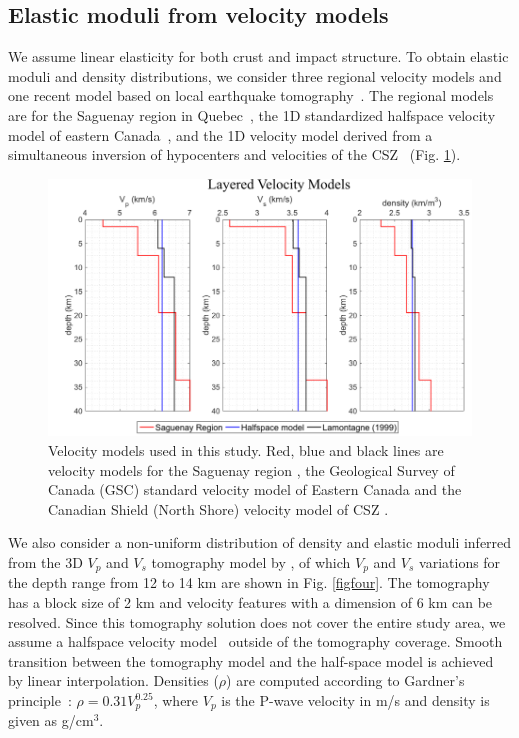 \documentclass[draft]{agujournal2018}
\begin{document}
\subsection{Elastic moduli from velocity models}
We assume linear elasticity for both crust and impact structure. To obtain elastic moduli and density distributions, we consider three regional velocity models and one recent model based on local earthquake tomography~\citep{Powell_2017}. The regional models are for the Saguenay region in Quebec~\citep{Somerville1990}, the 1D standardized halfspace velocity model of eastern Canada~\citep{lamontagne1999}, and the 1D velocity model derived from a simultaneous inversion of hypocenters and velocities of the CSZ~\citep{lamontagne1999} (Fig. \ref{figthree}).

\begin{figure}[ht]
\centering
\includegraphics[width=30pc]{Figures/layered_vel_models.png}
\caption{Velocity models used in this study. Red, blue and black lines are velocity models for the Saguenay region \citep{Somerville1990}, the Geological Survey of Canada (GSC) standard velocity model of Eastern Canada \citep{lamontagne1999} and the Canadian Shield (North Shore) velocity model of CSZ \citep{lamontagne1999}.}
\label{figthree}
\end{figure}

We also consider a non-uniform distribution of density and elastic moduli inferred from the 3D $V_p$ and $V_s$ tomography model by \citet{Powell_2017}, of which $V_p$ and $V_s$ variations for the depth range from 12 to 14 km are shown in Fig. \ref{figfour}. The tomography has a block size of 2 km and velocity features with a dimension of 6 km can be resolved. Since this tomography solution does not cover the entire study area, we assume a halfspace velocity model~\citep{lamontagne1999} outside of the tomography coverage. Smooth transition between the tomography model and the half-space model is achieved by linear interpolation. Densities ($\rho$) are computed according to Gardner's principle~\citep{Gardner_1974}: $\rho=0.31 V_p^{0.25}$, where $V_p$ is the P-wave velocity in m/s and density is given as g/cm$^3$.
\end{document}
